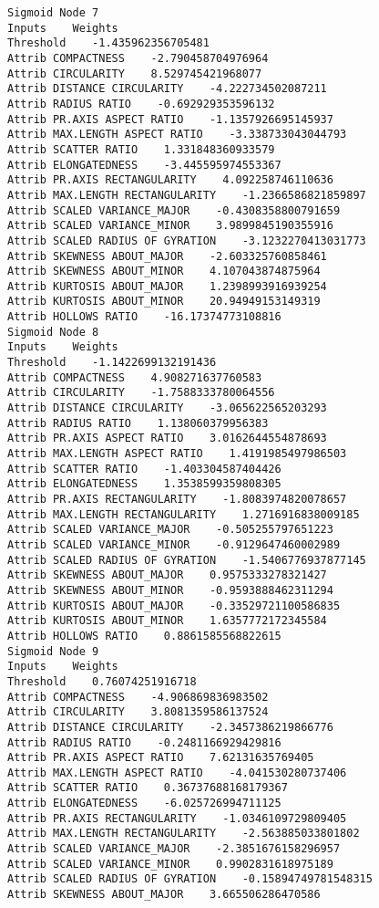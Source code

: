 \documentclass[
	article,			%
	11pt,				%
	oneside,			%
	a4paper,			%
	english,			%
	brazil,				%
	sumario=tradicional
	]{abntex2}
\begin{document}
\begin{lstlisting}
Sigmoid Node 7
Inputs    Weights
Threshold    -1.435962356705481
Attrib COMPACTNESS    -2.790458704976964
Attrib CIRCULARITY    8.529745421968077
Attrib DISTANCE CIRCULARITY    -4.222734502087211
Attrib RADIUS RATIO    -0.692929353596132
Attrib PR.AXIS ASPECT RATIO    -1.1357926695145937
Attrib MAX.LENGTH ASPECT RATIO    -3.338733043044793
Attrib SCATTER RATIO    1.331848360933579
Attrib ELONGATEDNESS    -3.445595974553367
Attrib PR.AXIS RECTANGULARITY    4.092258746110636
Attrib MAX.LENGTH RECTANGULARITY    -1.2366586821859897
Attrib SCALED VARIANCE_MAJOR    -0.4308358800791659
Attrib SCALED VARIANCE_MINOR    3.9899845190355916
Attrib SCALED RADIUS OF GYRATION    -3.1232270413031773
Attrib SKEWNESS ABOUT_MAJOR    -2.603325760858461
Attrib SKEWNESS ABOUT_MINOR    4.107043874875964
Attrib KURTOSIS ABOUT_MAJOR    1.2398993916939254
Attrib KURTOSIS ABOUT_MINOR    20.94949153149319
Attrib HOLLOWS RATIO    -16.17374773108816
Sigmoid Node 8
Inputs    Weights
Threshold    -1.1422699132191436
Attrib COMPACTNESS    4.908271637760583
Attrib CIRCULARITY    -1.7588333780064556
Attrib DISTANCE CIRCULARITY    -3.065622565203293
Attrib RADIUS RATIO    1.138060379956383
Attrib PR.AXIS ASPECT RATIO    3.0162644554878693
Attrib MAX.LENGTH ASPECT RATIO    1.4191985497986503
Attrib SCATTER RATIO    -1.403304587404426
Attrib ELONGATEDNESS    1.3538599359808305
Attrib PR.AXIS RECTANGULARITY    -1.8083974820078657
Attrib MAX.LENGTH RECTANGULARITY    1.2716916838009185
Attrib SCALED VARIANCE_MAJOR    -0.505255797651223
Attrib SCALED VARIANCE_MINOR    -0.9129647460002989
Attrib SCALED RADIUS OF GYRATION    -1.5406776937877145
Attrib SKEWNESS ABOUT_MAJOR    0.9575333278321427
Attrib SKEWNESS ABOUT_MINOR    -0.9593888462311294
Attrib KURTOSIS ABOUT_MAJOR    -0.33529721100586835
Attrib KURTOSIS ABOUT_MINOR    1.6357772172345584
Attrib HOLLOWS RATIO    0.8861585568822615
Sigmoid Node 9
Inputs    Weights
Threshold    0.76074251916718
Attrib COMPACTNESS    -4.906869836983502
Attrib CIRCULARITY    3.8081359586137524
Attrib DISTANCE CIRCULARITY    -2.3457386219866776
Attrib RADIUS RATIO    -0.2481166929429816
Attrib PR.AXIS ASPECT RATIO    7.62131635769405
Attrib MAX.LENGTH ASPECT RATIO    -4.041530280737406
Attrib SCATTER RATIO    0.36737688168179367
Attrib ELONGATEDNESS    -6.025726994711125
Attrib PR.AXIS RECTANGULARITY    -1.0346109729809405
Attrib MAX.LENGTH RECTANGULARITY    -2.563885033801802
Attrib SCALED VARIANCE_MAJOR    -2.3851676158296957
Attrib SCALED VARIANCE_MINOR    0.9902831618975189
Attrib SCALED RADIUS OF GYRATION    -0.15894749781548315
Attrib SKEWNESS ABOUT_MAJOR    3.665506286470586

\end{lstlisting}
\end{document}
